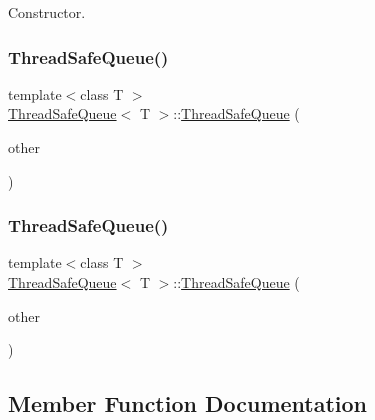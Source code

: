 Constructor. 

\mbox{\label{class_thread_safe_queue_a0f3f492104e38b019a5e1a74647cec39}} 
\subsubsection{\texorpdfstring{Thread\+Safe\+Queue()}{ThreadSafeQueue()}\hspace{0.1cm}{\footnotesize\ttfamily [2/3]}}
{\footnotesize\ttfamily template$<$class T $>$ \\
\hyperlink{class_thread_safe_queue}{Thread\+Safe\+Queue}$<$ T $>$\+::\hyperlink{class_thread_safe_queue}{Thread\+Safe\+Queue} (\begin{DoxyParamCaption}\item[{const \hyperlink{class_thread_safe_queue}{Thread\+Safe\+Queue}$<$ T $>$ \&}]{other }\end{DoxyParamCaption})\hspace{0.3cm}{\ttfamily [delete]}}

\mbox{\label{class_thread_safe_queue_a51c1e1c4eb980e2cb5d3012de447bbd5}} 
\subsubsection{\texorpdfstring{Thread\+Safe\+Queue()}{ThreadSafeQueue()}\hspace{0.1cm}{\footnotesize\ttfamily [3/3]}}
{\footnotesize\ttfamily template$<$class T $>$ \\
\hyperlink{class_thread_safe_queue}{Thread\+Safe\+Queue}$<$ T $>$\+::\hyperlink{class_thread_safe_queue}{Thread\+Safe\+Queue} (\begin{DoxyParamCaption}\item[{const \hyperlink{class_thread_safe_queue}{Thread\+Safe\+Queue}$<$ T $>$ \&\&}]{other }\end{DoxyParamCaption})\hspace{0.3cm}{\ttfamily [delete]}}



\subsection{Member Function Documentation}
\mbox{\label{class_thread_safe_queue_a58b5532baa6110071f697ad1f9bfbf58}} 
